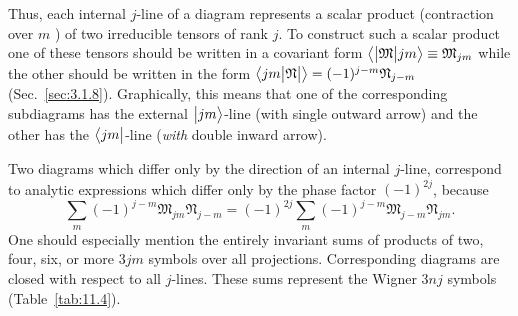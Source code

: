 Thus, each internal \(j\)-line of a diagram represents a scalar product (contraction over \(m\) ) of two irreducible tensors of rank \(j\). To construct such a scalar product one of these tensors should be written in a covariant form \(\bigl\langle  \big| \mathfrak{M} \big| j m \bigr\rangle \equiv \mathfrak{M}_{j m}\) while the other should be written in the form \(\bigl\langle j m \big| \mathfrak{N} \big|  \bigr\rangle=(-1)^{j-m} \mathfrak{N}_{j-m}\) (Sec.~\ref{sec:3.1.8}). Graphically, this means that one of the corresponding subdiagrams has the external \(\bigl| j m \bigr\rangle\)-line (with single outward arrow) and the other has the  \(\bigl\langle j m \bigr|\)-line (\emph{with}  double inward arrow).

Two diagrams which differ only by the direction of an internal \(j\)-line, correspond to analytic expressions which differ only by the phase factor \((-1)^{2 j}\), because
\begin{equation}
\sum_{m}(-1)^{j-m} \mathfrak{M}_{j m} \mathfrak{N}_{j-m}=(-1)^{2 j} \sum_{m}(-1)^{j-m} \mathfrak{M}_{j-m} \mathfrak{N}_{j m} .
\end{equation}
One should especially mention the entirely invariant sums of products of two, four, six, or more \(3 j m\) symbols over all projections. Corresponding diagrams are closed with respect to all \(j\)-lines. These sums represent the Wigner \(3 n j\) symbols (Table~\ref{tab:11.4}).

